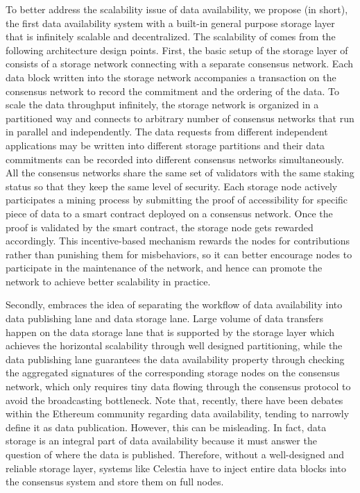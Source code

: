 To better address the scalability issue of data availability, we propose \project (\projabbrev in short), the first data availability system with a built-in general purpose storage layer that is infinitely scalable and decentralized. The scalability of \projabbrev comes from the following architecture design points. 
First, the basic setup of the storage layer of \projabbrev consists of a storage network connecting with a separate consensus network. Each data block written into the storage network accompanies a transaction on the consensus network to record the commitment and the ordering of the data. 
To scale the data throughput infinitely, the storage network is organized in a partitioned way and connects to arbitrary number of consensus networks that run in parallel and independently. 
The data requests from different independent applications may be written into different storage partitions and their data commitments can be recorded into different consensus networks simultaneously.
All the consensus networks share the same set of validators with the same staking status so that they keep the same level of security.    
Each storage node actively participates a mining process by submitting the proof of accessibility for specific piece of data to a smart contract deployed on a consensus network. Once the proof is validated by the smart contract, the storage node gets rewarded accordingly. 
This incentive-based mechanism rewards the nodes for contributions rather than punishing them for misbehaviors, so it can better encourage nodes to participate in the maintenance of the network, and hence can promote the network to achieve better scalability in practice.

Secondly, \projabbrev embraces the idea of separating the workflow of data availability into data publishing lane and data storage lane. 
Large volume of data transfers happen on the data storage lane that is supported by the storage layer which achieves the horizontal scalability through well designed partitioning, while the data publishing lane guarantees the data availability property through checking the aggregated signatures of the corresponding storage nodes on the consensus network, which only requires tiny data flowing through the consensus protocol to avoid the broadcasting bottleneck. 
Note that, recently, there have been debates within the Ethereum community regarding data availability, tending to narrowly define it as data publication. However, this can be misleading. In fact, data storage is an integral part of data availability because it must answer the question of where the data is published. Therefore, without a well-designed and reliable storage layer, systems like Celestia have to inject entire data blocks into the consensus system and store them on full nodes.

